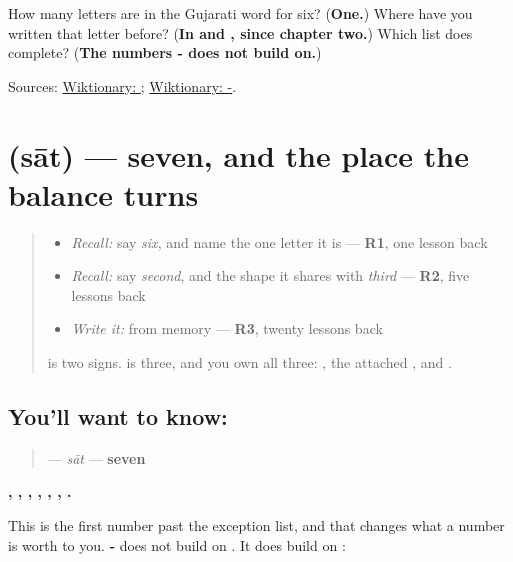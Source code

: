 \begin{tcolorbox}[breakable,colback=teal!4,colframe=teal!35!black,title={Before you move on}]
How many letters are in the Gujarati word for six? (\textbf{One.}) Where have you written that letter before? (\textbf{In  and , since chapter two.}) Which list does \textbf{} complete? (\textbf{The numbers - does not build on.})

Sources: \href{https://en.wiktionary.org/wiki/\%E0\%AA\%9B}{Wiktionary: }; \href{https://en.wiktionary.org/wiki/-\%E0\%AA\%AE\%E0\%AB\%81\%E0\%AA\%82}{Wiktionary: -}.
\end{tcolorbox}
\section[\texorpdfstring{\gu{સાત} (sāt)}{સાત (sāt)}]{ (sāt) — seven, and the place the balance turns}

\label{lesson:GU-C39-saat}



\begin{quote}
\begin{itemize}
\raggedright
  \item \emph{Recall:} say \emph{six}, and name the one letter it is — \textbf{R1}, one lesson back
  \item \emph{Recall:} say \emph{second}, and the shape it shares with \emph{third} — \textbf{R2}, five lessons back
  \item \emph{Write it:} \textbf{} from memory — \textbf{R3}, twenty lessons back
\end{itemize}

\textbf{} is two signs. \textbf{} is three, and you own all three: \textbf{}, the attached \textbf{}, and \textbf{}.
\end{quote}

\subsection*{You'll want to know: }
\begin{quote}
\textbf{} — \emph{sāt} — \textbf{seven}
\end{quote}

\textbf{, , , , , , .}

This is the first number past the exception list, and that changes what a number is worth to you. \textbf{-} does not build on \textbf{}. It does build on \textbf{}:

